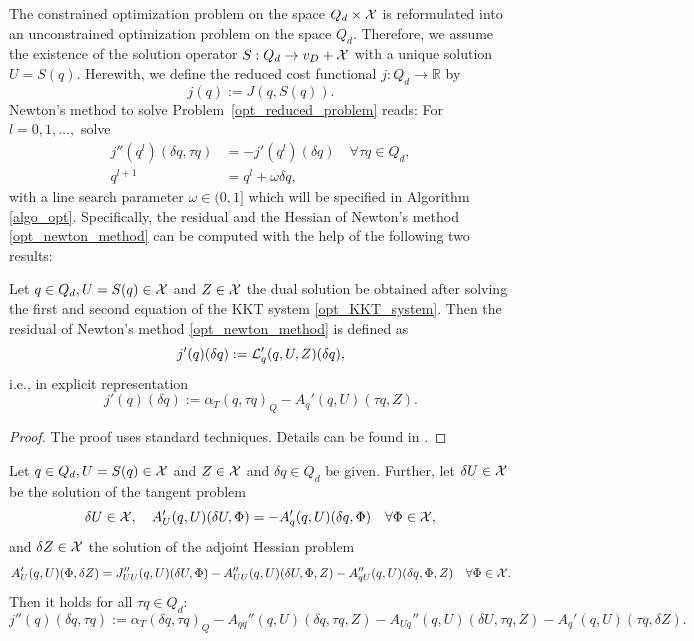 \documentclass[prodmode,acmtoms]{acmsmall}
\numberwithin{equation}{section}
\begin{document}
%
The constrained optimization problem  on the space $Q_d\times {\cal X}$ 
is reformulated into an unconstrained optimization problem on the
space $Q_d$. Therefore, we assume the existence of the solution operator  
$S:Q_d\rightarrow {v_D+{\cal X}}$ with a unique solution
$U=S(q)$. Herewith, we define the reduced cost functional
$j:Q_d\rightarrow \mathbb{R}$ by 
%
\begin{equation}
  \label{opt_reduced_functional}
  j(q) := J(q,S(q)) .
\end{equation}
%
Newton's method to solve Problem~\ref{opt_reduced_problem} reads:
For $l=0,1,\ldots,$ solve
\begin{equation}
\label{opt_newton_method}
\begin{aligned}
j''(q^l)(\delta q , \tau q) &= -j'(q^l)(\delta q) 
\quad\forall\tau q\in Q_d, \\
q^{l+1} &= q^l + \omega\delta q,
\end{aligned} 
\end{equation}
with a line search parameter $\omega\in (0,1]$ which 
will be specified in Algorithm \ref{algo_opt}.
Specifically, the residual and the Hessian of Newton's method 
\eqref{opt_newton_method}
can be computed with the help of the following two results:
\begin{proposition}
\label{prop_newton_residual}
Let $q\in Q_d, U=S(q)\in {\cal X}$
and $Z\in {\cal X}$ the dual solution be obtained after solving 
the first and second equation of the KKT system 
\eqref{opt_KKT_system}. 
Then the residual of Newton's method \eqref{opt_newton_method} 
is defined as
\begin{equation*}
j'(q)(\delta q) := {\cal L}'_{q}(q,U,Z)(\delta q),
\end{equation*}
i.e., in explicit representation
\begin{equation*}
j'(q)(\delta q) := \alpha_T (q , \tau q)_Q - 
A_{q}'(q,U)(\tau q , Z).
\end{equation*}
\end{proposition}
\begin{proof}
The proof uses standard techniques. Details can be found in  
\cite{BeMeVe06}.
\end{proof}
\begin{proposition}
  \label{prop_newton_hessian}
  Let $q\in Q_d, U=S(q)\in {\cal X}$ and $Z\in {\cal X}$ and  $\delta
  q\in Q_d$ be given. Further, let $\delta U\in {\cal X}$ be the
  solution of the tangent problem 
  \[
  \delta U\in{\cal X},\quad 
  A_{U}'(q,U)(\delta U , \Phi) 
  = -A_{q}'(q,U)(\delta q , \Phi)  \quad\forall \Phi\in {\cal
    X},
  \]
  and $\delta Z\in {\cal X}$ the solution of the adjoint Hessian 
  problem  
  \[
  A_{U}'(q,U)(\Phi, \delta Z)
  = J''_{UU}(q,U)(\delta U, \Phi)
  - A_{UU}''(q,U)(\delta U, \Phi, Z)
  - A_{qU}''(q,U)(\delta q , \Phi, Z)  \quad\forall \Phi\in
  {\cal X}. 
  \]
 Then it holds  for all $\tau q\in Q_d$:
  \[
  j''(q)(\delta q, \tau q):= 
  \alpha_T (\delta q , \tau q)_Q -
  A_{qq}''(q, U)(\delta q, \tau q , Z) -
  A_{Uq}''(q,U)(\delta U, \tau q , Z) -
  A_{q}'(q,U)(\tau q , \delta Z).
  \]
\end{proposition}
\end{document}
